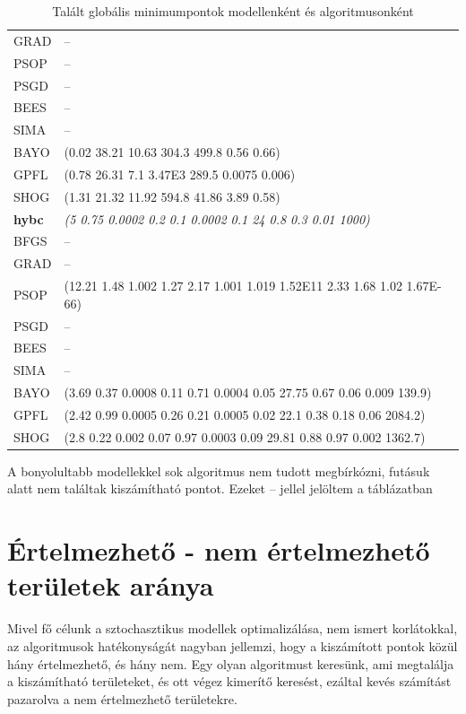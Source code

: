\begin{table}
\begin{tabular}{ll}
		GRAD & --\\
		PSOP & --\\
		PSGD & --\\
		BEES & --\\
		SIMA & --\\
		{\color{red}BAYO} & {\color{red}(0.02 38.21 10.63 304.3 499.8 0.56 0.66)}\\
		{\color{red}GPFL} & {\color{red}(0.78 26.31 7.1 3.47E3 289.5 0.0075 0.006)}\\
		{\color{red}SHOG} & {\color{red}(1.31 21.32 11.92 594.8 41.86 3.89 0.58)}\\
		\hline
		\textbf{hybc} & \textit{(5 0.75 0.0002 0.2 0.1 0.0002 0.1 24 0.8 0.3 0.01 1000)}\\
		\hline
		BFGS & --\\
		GRAD & --\\
		PSOP & (12.21 1.48 1.002 1.27 2.17 1.001 1.019 1.52E11 2.33 1.68 1.02 1.67E-66)\\
		PSGD & --\\
		BEES & --\\
		SIMA & --\\
		{\color{red}BAYO} & {\color{red}(3.69 0.37 0.0008 0.11 0.71 0.0004 0.05 27.75 0.67 0.06 0.009 139.9)}\\
		{\color{red}GPFL} & {\color{red}(2.42 0.99 0.0005 0.26 0.21 0.0005 0.02 22.1 0.38 0.18 0.06 2084.2)}\\
		{\color{red}SHOG} & {\color{red}(2.8 0.22 0.002 0.07 0.97 0.0003 0.09 29.81 0.88 0.97 0.002 1362.7)}\\	
	\end{tabular}
	\caption{Talált globális minimumpontok modellenként és algoritmusonként}
	\label{table:globalminimumpoints}
	\begin{tablenotes}
		A bonyolultabb modellekkel sok algoritmus nem tudott megbírkózni, futásuk alatt nem találtak kiszámítható pontot. Ezeket -- jellel jelöltem a táblázatban
	\end{tablenotes}
\end{table}
\section{Értelmezhető - nem értelmezhető területek aránya}
\label{sec:teruletek}
Mivel fő célunk a sztochasztikus modellek optimalizálása, nem ismert korlátokkal, az algoritmusok hatékonyságát nagyban jellemzi, hogy a kiszámított pontok közül hány értelmezhető, és hány nem. Egy olyan algoritmust keresünk, ami megtalálja a kiszámítható területeket, és ott végez kimerítő keresést, ezáltal kevés számítást pazarolva a nem értelmezhető területekre.


